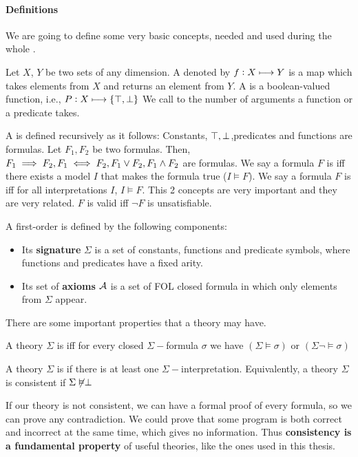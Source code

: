 \paragraph{Definitions}

We are going to define some very basic concepts, needed and used during the whole \thisworkmp.


Let $X$, $Y$ be two sets of any dimension.
%
A  denoted by $f : X\longmapsto Y$ is a map which takes elements from $X$ and returns an element from $Y$.
%
A  is a boolean-valued function, i.e., $P : X\longmapsto \{\top,\perp\}$
%
We call  to the number of arguments a function or a predicate takes.

A  is defined recursively as it follows: Constants, $\top,\perp$,predicates and functions are formulas. Let $F_1,F_2$ be two formulas. Then, $F_1\implies F_2, F_1\iff F_2, F_1\vee F_2, F_1\wedge F_2$ are formulas.
%
We say a formula $F$ is  \gls{iff} there exists a model $I$ that makes the formula true ($I \vDash F$). 
%
We say a formula $F$ is  \gls{iff} for all interpretations $I$, $I\vDash F$.
\label{def:validity}
This 2 concepts are very important and they are very related. $F$ is valid \gls{iff} $\neg F$ is unsatisfiable. 


A first-order  is defined by the following components: 
\begin{itemize}
	\item Its \textbf{signature} $\Sigma$ is a set of constants, functions and predicate symbols, where functions and predicates have a fixed arity.
	\item Its set of \textbf{axioms} $\mathcal{A}$ is a set of \gls{FOL} closed formula in which only elements from $\Sigma$ appear.
\end{itemize}


There are some important properties that a theory may have. 

A theory $\Sigma$ is  \gls{iff} for every closed $\Sigma-$formula $\sigma$ we have $(\Sigma\vDash \sigma) \text{ or } (\Sigma\neg\vDash \sigma) $

A theory $\Sigma$ is  if there is at least one $\Sigma-$interpretation.	Equivalently, a theory $\Sigma$ is consistent if $\Sigma \not\vDash \perp$

If our theory is not consistent, we can have a formal proof of every formula, so we can prove any contradiction. 
%
We could prove that some program is both correct and incorrect at the same time, which gives no information. 
%
Thus \textbf{consistency is a fundamental property} of useful theories, like the ones used in this thesis.

